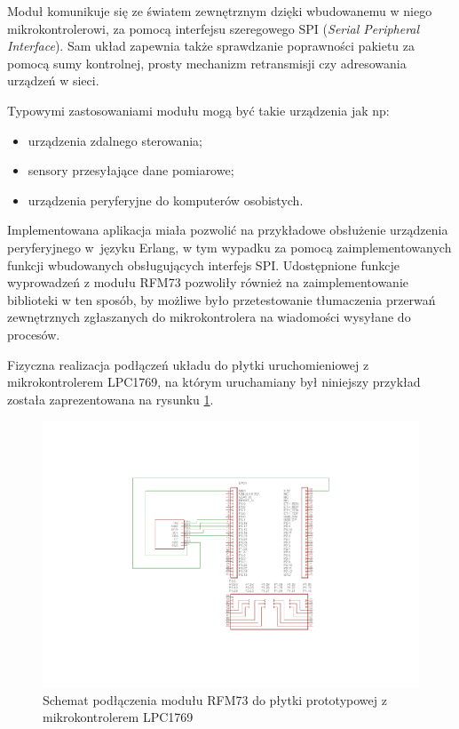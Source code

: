 Moduł komunikuje się ze światem zewnętrznym dzięki wbudowanemu w niego mikrokontrolerowi, za pomocą interfejsu szeregowego SPI (\emph{Serial Peripheral Interface}). Sam układ zapewnia także sprawdzanie poprawności pakietu za pomocą sumy kontrolnej, prosty mechanizm retransmisji czy adresowania urządzeń w sieci.

Typowymi zastosowaniami modułu mogą być takie urządzenia jak np:
\begin{itemize}
\item urządzenia zdalnego sterowania;
\item sensory przesyłające dane pomiarowe;
\item urządzenia peryferyjne do komputerów osobistych.
\end{itemize}

Implementowana aplikacja miała pozwolić na przykładowe obsłużenie urządzenia peryferyjnego w~języku Erlang, w tym wypadku za pomocą zaimplementowanych funkcji wbudowanych obsługujących interfejs SPI.
Udostępnione funkcje wyprowadzeń z modułu RFM73 pozwoliły również na zaimplementowanie biblioteki w ten sposób, by możliwe było przetestowanie tłumaczenia przerwań zewnętrznych zgłaszanych do mikrokontrolera na wiadomości wysyłane do procesów.

Fizyczna realizacja podłączeń układu do płytki uruchomieniowej z mikrokontrolerem LPC1769, na którym uruchamiany był niniejszy przykład została zaprezentowana na rysunku \ref{fig:examplerfm}.

\begin{figure}[h]
\centerline{\includegraphics[scale=1, clip, trim=0 40mm 0 40mm]{example_rfm}}
\caption{Schemat podłączenia modułu RFM73 do płytki prototypowej z mikrokontrolerem LPC1769}
\label{fig:examplerfm}
\end{figure}


